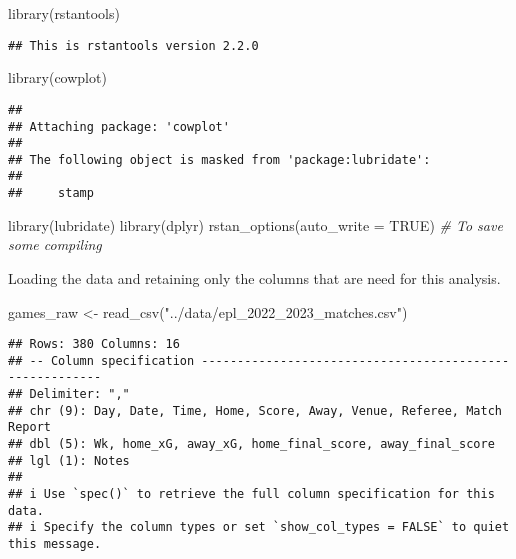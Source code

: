 \documentclass[
]{article}
\newenvironment{Shaded}{\begin{snugshade}}{\end{snugshade}}
\newcommand{\AttributeTok}[1]{\textcolor[rgb]{0.77,0.63,0.00}{#1}}
\newcommand{\CommentTok}[1]{\textcolor[rgb]{0.56,0.35,0.01}{\textit{#1}}}
\newcommand{\ConstantTok}[1]{\textcolor[rgb]{0.00,0.00,0.00}{#1}}
\newcommand{\FunctionTok}[1]{\textcolor[rgb]{0.00,0.00,0.00}{#1}}
\newcommand{\NormalTok}[1]{#1}
\newcommand{\OtherTok}[1]{\textcolor[rgb]{0.56,0.35,0.01}{#1}}
\newcommand{\StringTok}[1]{\textcolor[rgb]{0.31,0.60,0.02}{#1}}
\begin{document}
\begin{Shaded}
\begin{Highlighting}[]
\FunctionTok{library}\NormalTok{(rstantools)}
\end{Highlighting}
\end{Shaded}

\begin{verbatim}
## This is rstantools version 2.2.0
\end{verbatim}

\begin{Shaded}
\begin{Highlighting}[]
\FunctionTok{library}\NormalTok{(cowplot)}
\end{Highlighting}
\end{Shaded}

\begin{verbatim}
## 
## Attaching package: 'cowplot'
## 
## The following object is masked from 'package:lubridate':
## 
##     stamp
\end{verbatim}

\begin{Shaded}
\begin{Highlighting}[]
\FunctionTok{library}\NormalTok{(lubridate)}
\FunctionTok{library}\NormalTok{(dplyr)}
\FunctionTok{rstan\_options}\NormalTok{(}\AttributeTok{auto\_write =} \ConstantTok{TRUE}\NormalTok{)  }\CommentTok{\# To save some compiling}
\end{Highlighting}
\end{Shaded}

Loading the data and retaining only the columns that are need for this
analysis.

\begin{Shaded}
\begin{Highlighting}[]
\NormalTok{games\_raw }\OtherTok{\textless{}{-}} \FunctionTok{read\_csv}\NormalTok{(}\StringTok{"../data/epl\_2022\_2023\_matches.csv"}\NormalTok{)}
\end{Highlighting}
\end{Shaded}

\begin{verbatim}
## Rows: 380 Columns: 16
## -- Column specification --------------------------------------------------------
## Delimiter: ","
## chr (9): Day, Date, Time, Home, Score, Away, Venue, Referee, Match Report
## dbl (5): Wk, home_xG, away_xG, home_final_score, away_final_score
## lgl (1): Notes
## 
## i Use `spec()` to retrieve the full column specification for this data.
## i Specify the column types or set `show_col_types = FALSE` to quiet this message.
\end{verbatim}
\end{document}
